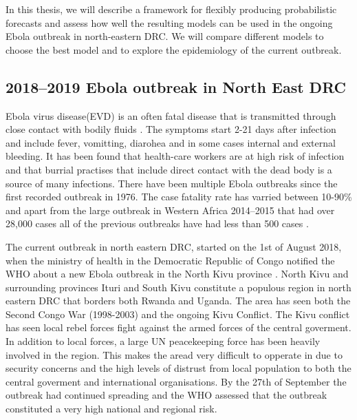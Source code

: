 \documentclass[12pt]{article}
\begin{document}
In this thesis, we will describe a framework for flexibly producing probabilistic forecasts and assess how well the resulting models can be used in the ongoing Ebola outbreak in north-eastern DRC. We will compare different models to choose the best model and to explore the epidemiology of the current outbreak. 

\subsection{2018--2019 Ebola outbreak in North East DRC}

Ebola virus disease(EVD) is an often fatal disease that is transmitted through close contact with bodily fluids \cite{worldhealthorganisationEbolaVirusDisease}. The symptoms start 2-21 days after infection and include fever, vomitting, diarohea and in some cases internal and external bleeding. It has been found that health-care workers are at high risk of infection and that burrial practises that include direct contact with the dead body is a source of many infections\cite{brainardRiskFactorsTransmission2016}. There have been multiple Ebola outbreaks since the first recorded outbreak in 1976. The case fatality rate has varried between 10-90\% and apart from the large outbreak in Western Africa 2014--2015 that had over 28,000 cases all of the previous outbreaks have had less than 500 cases \cite{worldhealthorganisationEbolaVirusDisease}.

The current outbreak in north eastern DRC, started on the 1st of August 2018, when the ministry of health in the Democratic Republic of Congo notified the WHO about a new Ebola outbreak in the North Kivu province \cite{worldhealthorganizationEbolaOutbreakDRC2018a}. North Kivu and surrounding provinces Ituri and South Kivu constitute a populous region in north eastern DRC that borders both Rwanda and Uganda. The area has seen both the Second Congo War (1998-2003) and the ongoing Kivu Conflict. The Kivu conflict has seen local rebel forces fight against the armed forces of the central goverment. In addition to local forces, a large UN peacekeeping force has been heavily involved in the region. This makes the aread very difficult to opperate in due to security concerns and the high levels of distrust from local population to both the central goverment and international organisations. By the 27th of September the outbreak had continued spreading and the WHO assessed that the outbreak constituted a very high national and regional risk\cite{worldhealthorganizationEbolaOutbreakDRC2018b}.
\end{document}
